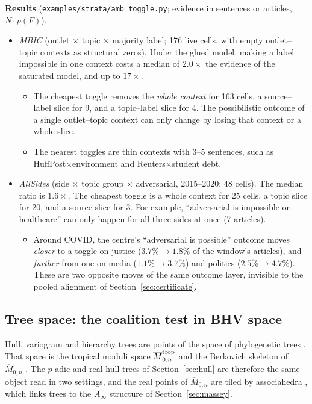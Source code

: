 \documentclass[11pt]{article}
\theoremstyle{definition}
\theoremstyle{remark}
\begin{document}
\textbf{Results} (\texttt{examples/strata/amb\_toggle.py}; evidence in sentences or articles, $N\cdot p(F)$).
\begin{itemize}
  \item \emph{MBIC} (outlet $\times$ topic $\times$ majority label; 176 live cells, with empty outlet--topic contexts as structural zeros). Under the glued model, making a label impossible in one context costs a median of $2.0\times$ the evidence of the saturated model, and up to $17\times$.
    \begin{itemize}
      \item The cheapest toggle removes the \emph{whole context} for 163 cells, a source--label slice for 9, and a topic--label slice for 4. The possibilistic outcome of a single outlet--topic context can only change by losing that context or a whole slice.
      \item The nearest toggles are thin contexts with 3--5 sentences, such as HuffPost$\times$environment and Reuters$\times$student debt.
    \end{itemize}
  \item \emph{AllSides} (side $\times$ topic group $\times$ adversarial, 2015--2020; 48 cells). The median ratio is $1.6\times$. The cheapest toggle is a whole context for 25 cells, a topic slice for 20, and a source slice for 3. For example, ``adversarial is impossible on healthcare'' can only happen for all three sides at once (7 articles).
    \begin{itemize}
      \item Around COVID, the centre's ``adversarial is possible'' outcome moves \emph{closer} to a toggle on justice ($3.7\%\to1.8\%$ of the window's articles), and \emph{further} from one on media ($1.1\%\to3.7\%$) and politics ($2.5\%\to4.7\%$). These are two opposite moves of the same outcome layer, invisible to the pooled alignment of Section~\ref{sec:certificate}.
    \end{itemize}
\end{itemize}

\subsection{Tree space: the coalition test in BHV space}\label{sec:bhv}
Hull, variogram and hierarchy trees are points of the space of phylogenetic trees \cite{bhv}. That space is the tropical moduli space $\overline M_{0,n}^{\rm trop}$ and the Berkovich skeleton of $\overline M_{0,n}$ \cite{speyer,acp}. The $p$-adic and real hull trees of Section~\ref{sec:hull} are therefore the same object read in two settings, and the real points of $\overline M_{0,n}$ are tiled by associahedra \cite{devadoss}, which links trees to the $A_\infty$ structure of Section~\ref{sec:massey}.
\end{document}
